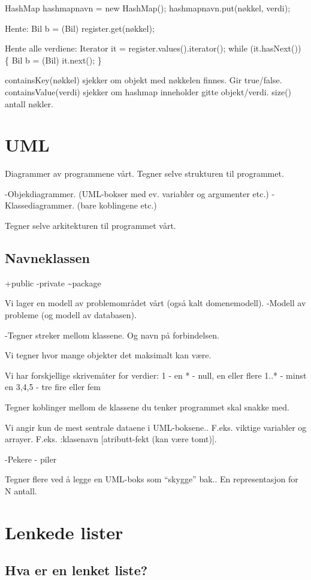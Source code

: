 \documentclass[11pt]{article}
\begin{document}
HashMap hashmapnavn = new HashMap();
hashmapnavn.put(nøkkel, verdi);

Hente: Bil b = (Bil) register.get(nøkkel);

Hente alle verdiene:
Iterator it = register.values().iterator();
while (it.hasNext()) \{
    Bil b = (Bil) it.next();
\}


containsKey(nøkkel) sjekker om objekt med nøkkelen finnes. Gir
true/false.
containsValue(verdi) sjekker om hashmap inneholder gitte objekt/verdi.
size() antall nøkler.
\section{UML}
\label{sec-7}


Diagrammer av programmene vårt.
Tegner selve strukturen til programmet.

-Objekdiagrammer. (UML-bokser med ev. variabler og argumenter etc.)
-Klassediagrammer. (bare koblingene etc.)

Tegner selve arkitekturen til programmet vårt. 
\subsection{Navneklassen}
\label{sec-7_1}


+public
-private
\~{}package

Vi lager en modell av problemområdet vårt (også kalt domenemodell).
-Modell av probleme (og modell av databasen).

-Tegner streker mellom klassene. Og navn på forbindelsen.

Vi tegner hvor mange objekter det maksimalt kan være.

Vi har forskjellige skrivemåter for verdier:
1 - en
 * -  null, en eller flere
1..* - minst en
3,4,5 - tre fire eller fem

Tegner koblinger mellom de klassene du tenker programmet skal snakke
med.

Vi angir kun de mest sentrale dataene i UML-boksene.. F.eks. viktige
variabler og arrayer.
F.eks. :klasenavn [atributt-fekt (kan være tomt)].

-Pekere - piler

Tegner flere ved å legge en UML-boks som ``skygge'' bak.. En
representasjon for N antall.
\section{Lenkede lister}
\label{sec-8}
\subsection{Hva er en lenket liste?}
\label{sec-8_1}
\end{document}
